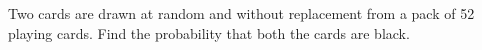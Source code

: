 \begin{flushleft}
Two cards are drawn at random and without replacement from a pack of 52 playing cards. Find the probability that both the cards are black.
\end{flushleft}